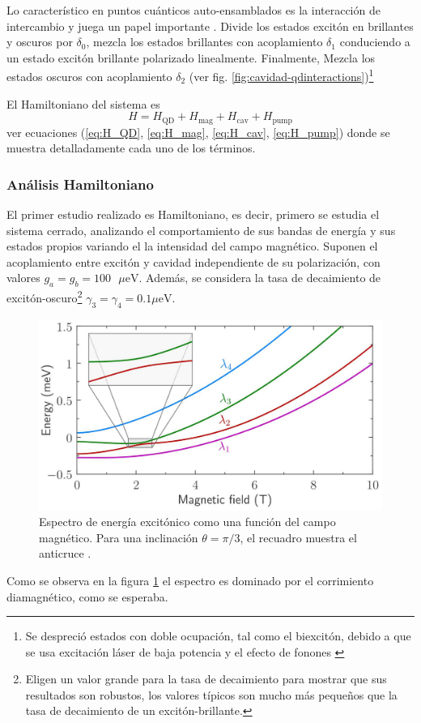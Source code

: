 \documentclass[main.tex]{subfiles}
\begin{document}
Lo característico en puntos cuánticos auto-ensamblados es la interacción de intercambio y juega un papel importante \parencite{Bayer2002}. Divide los estados excitón en brillantes y oscuros por $\delta_0$, mezcla los estados brillantes con acoplamiento $\delta_1$ conduciendo a un estado excitón brillante polarizado linealmente. Finalmente, Mezcla los estados oscuros con acoplamiento $\delta_2$ (ver fig. \ref{fig:cavidad-qdinteractions})\footnote{Se despreció estados con doble ocupación, tal como el biexcitón, debido a que se usa excitación láser de baja potencia y el efecto de fonones \parencite{Lüker2017}}

El Hamiltoniano del sistema es
\begin{equation}
	H = H_\text{QD} + H_\text{mag} + H_\text{cav} + H_\text{pump}
\end{equation}
ver ecuaciones (\ref{eq:H_QD}, \ref{eq:H_mag}, \ref{eq:H_cav}, \ref{eq:H_pump}) donde se muestra detalladamente cada uno de los términos.

\subsubsection{Análisis Hamiltoniano}

El primer estudio realizado es Hamiltoniano, es decir, primero se estudia el sistema cerrado, analizando el comportamiento de sus bandas de energía y sus estados propios variando el la intensidad del campo magnético. Suponen el acoplamiento entre excitón y cavidad independiente de su polarización, con valores $g_a = g_b = 100\text{ $\mu$eV}$. Además, se considera la tasa de decaimiento de excitón-oscuro\footnote{Eligen un valor grande para la tasa de decaimiento para mostrar que sus resultados son robustos, los valores típicos son mucho más pequeños que la tasa de decaimiento de un excitón-brillante.} $\gamma_3 = \gamma_4 = 0.1\text{$\mu$eV}$.

\begin{figure}[th]
	\centering
	\includegraphics[width=0.6\linewidth]{img/EnergyExcitonesMagnetic}
	\caption{Espectro de energía excitónico como una función del campo magnético. Para una inclinación $\theta = \pi/3$, el recuadro muestra el anticruce \parencite{Jimenez2017}.}
	\label{fig:energyexcitonesmagnetic}
\end{figure}
Como se observa en la figura \ref{fig:energyexcitonesmagnetic} el espectro es dominado por el corrimiento diamagnético, como se esperaba.
\end{document}
